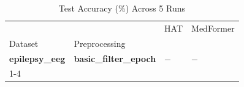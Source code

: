 \begin{table}
\caption{Test Accuracy (\%) Across 5 Runs}
\label{tab:results_acc}
\begin{tabular}{llll}
\toprule
 &  & HAT & MedFormer \\
Dataset & Preprocessing &  &  \\
\midrule
\textbf{epilepsy_eeg} & \textbf{basic_filter_epoch} & $-$ & $-$ \\
\cline{1-4}
\bottomrule
\end{tabular}
\end{table}
